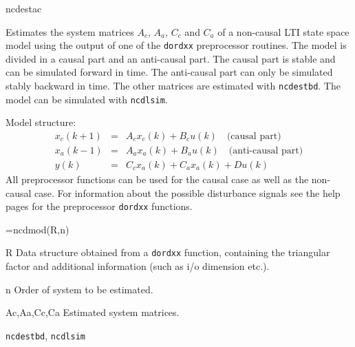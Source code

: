 \documentclass{book}
\newcommand{\dordxx}{\texttt{dordxx}}%
\newcommand{\ncdestbd}{\texttt{ncdestbd}}
\newcommand{\ncdlsim}{\texttt{ncdlsim}}
\begin{document}
\begin{command}{ncdestac}
\begin{purpose}
  Estimates the system matrices $A_c$, $A_a$, $C_c$ and $C_a$ of a
  non-causal LTI state space model using the output of one of the
  {\dordxx} preprocessor routines. The model is divided in a causal
  part and an anti-causal part.  The causal part is stable and can be
  simulated forward in time. The anti-causal part can only be
  simulated stably backward in time. The other matrices are estimated
  with {\ncdestbd}. The model can be simulated with {\ncdlsim}.

  Model structure:
  \begin{eqnarray*}
    x_c(k+1) &=& A_c x_c(k) + B_c u(k)\quad\mbox{(causal part)}\\
    x_a(k-1) &=& A_a x_a(k) + B_a u(k)\quad\mbox{(anti-causal part)}\\
    y(k)   &=& C_c x_a(k) + C_a x_a(k) + D u(k)
  \end{eqnarray*}
All preprocessor functions can be used for the causal case as well
as the non-causal case. For information about the possible disturbance
signals see the help pages for the preprocessor {\dordxx} functions.
\end{purpose}

\begin{syntax}
  [Ac,Aa,Cc,Ca]=ncdmod(R,n)
\end{syntax}

\begin{inputs}
\item[R] Data structure obtained from a {\dordxx} function, containing
  the triangular factor and additional information (such as i/o
  dimension etc.).
\item[n] Order of system to be estimated. 
\end{inputs}
\begin{outputs}
  \item[Ac,Aa,Cc,Ca]  Estimated system matrices.
\end{outputs}
\begin{seealso}
{\ncdestbd}, {\ncdlsim}
\end{seealso}
\end{command}%
\end{document}
